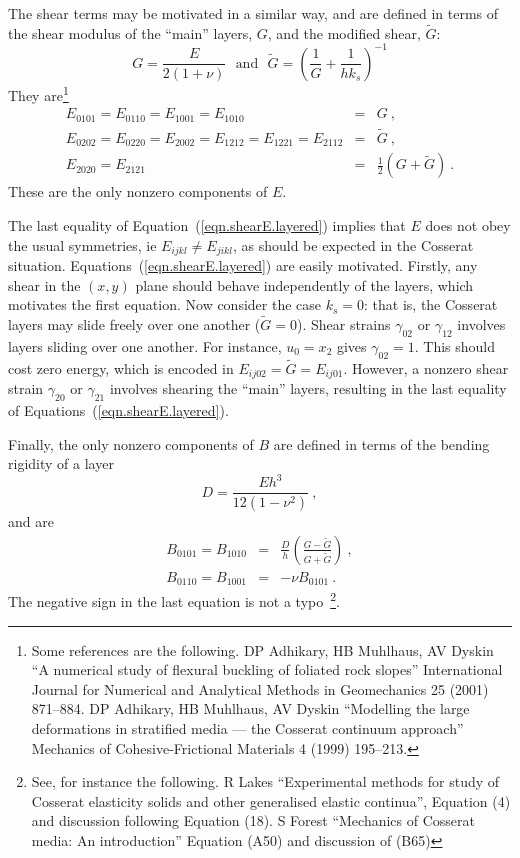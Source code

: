 \documentclass[]{scrreprt}
\begin{document}
The shear terms may be motivated in a similar way, and are defined in
terms of the shear modulus of the ``main'' layers, $G$, and the
modified shear, $\tilde{G}$:
\begin{equation}
G = \frac{E}{2(1+\nu)} \ \ \ \mbox{and}\ \ \ \tilde{G} = \left(
\frac{1}{G} + \frac{1}{hk_{s}} \right)^{-1}
\end{equation}
They
are\footnote{Some references are the following.  DP Adhikary, HB Muhlhaus, AV
  Dyskin ``A numerical study of flexural buckling of foliated rock
  slopes'' International Journal for Numerical and Analytical Methods
  in Geomechanics 25 (2001) 871--884.  DP Adhikary, HB Muhlhaus, AV
  Dyskin ``Modelling the large deformations in stratified media ---
  the Cosserat continuum approach'' Mechanics of Cohesive-Frictional
  Materials 4 (1999) 195--213.}
\begin{eqnarray}
E_{0101} = E_{0110} = E_{1001} = E_{1010} & = & G \ , \nonumber
\\
E_{0202} = E_{0220} = E_{2002} = E_{1212} = E_{1221} = E_{2112} & =
& \tilde{G} \ , \nonumber \\
E_{2020} = E_{2121} & = & \mbox{$\frac{1}{2}$}(G + \tilde{G})\ .
\label{eqn.shearE.layered}
\end{eqnarray}
These are the only nonzero components of $E$.

The last equality of Equation~(\ref{eqn.shearE.layered}) implies that
$E$ does not obey the usual symmetries, ie $E_{ijkl}\neq E_{jikl}$, as
should be expected in the Cosserat situation.
Equations~(\ref{eqn.shearE.layered}) are easily motivated.  Firstly,
any shear in the $(x,y)$ plane should behave independently of the
layers, which motivates the first equation.  Now consider the case
$k_{s}=0$: that is, the Cosserat layers may slide freely over one
another ($\tilde{G}=0$).  Shear strains $\gamma_{02}$ or $\gamma_{12}$
involves layers sliding over one another.  For instance, $u_{0} =
x_{2}$ gives $\gamma_{02}=1$.  This should cost zero energy, which is
encoded in $E_{ij02}=\tilde{G}=E_{ij01}$.  However, a nonzero shear
strain $\gamma_{20}$ or $\gamma_{21}$ involves shearing the ``main''
layers, resulting in the last equality of
Equations~(\ref{eqn.shearE.layered}).

Finally, the only nonzero components of $B$ are defined in terms of
the bending rigidity of a layer
\begin{equation}
D = \frac{Eh^{3}}{12(1-\nu^{2})} \ ,
\end{equation}
and are
\begin{eqnarray}
B_{0101} = B_{1010} & = & \frac{D}{h} \left(\frac{G - \tilde{G}}{G +
  \tilde{G}}\right) \ , \nonumber \\
B_{0110} = B_{1001} & = & -\nu B_{0101} \ .
\end{eqnarray}
The negative sign in the last equation is not a typo~\footnote{See, for
  instance the following.  R Lakes ``Experimental methods for study of
  Cosserat elasticity solids and other generalised elastic continua'',
  Equation (4) and discussion following Equation (18).  S Forest
  ``Mechanics of Cosserat media: An introduction'' Equation (A50) and
  discussion of (B65)}.
\end{document}
